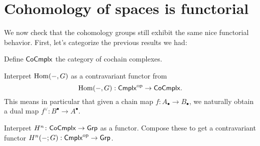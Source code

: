 \section{Cohomology of spaces is functorial}
We now check that the cohomology groups still exhibit the same nice functorial behavior.
First, let's categorize the previous results we had:

\begin{ques}
	Define $\mathsf{CoCmplx}$
	the category of cochain complexes.
\end{ques}

\begin{exercise}
	Interpret $\operatorname{Hom}(-,G)$ as a contravariant functor
	from \[ \operatorname{Hom}(-,G) : \mathsf{Cmplx}^{\mathrm{op}} \to \mathsf{CoCmplx}. \]
	This means in particular that given a chain map $f \colon A_\bullet \to B_\bullet$,
	we naturally obtain a dual map $f^\vee \colon B^\bullet \to A^\bullet$.
\end{exercise}

\begin{ques}
	Interpret $H^n \colon \mathsf{CoCmplx} \to \mathsf{Grp}$ as a functor.
	Compose these to get a contravariant functor
	$H^n(-;G) : \mathsf{Cmplx}^{\mathrm{op}} \to \mathsf{Grp}$.
\end{ques}

